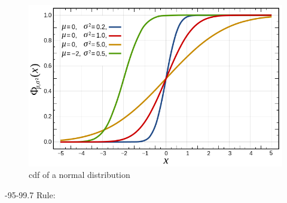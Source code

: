 \documentclass[	DIV=calc,%
paper=a4,%
fontsize=11pt,%
twocolumn]{scrartcl} %
\begin{document}
\begin{figure}[ht!]
	\centering
	\caption{cdf of a normal distribution}
	\label{fig:cdf-normal}
	\graphicspath{ {images/math/} }
	\includegraphics[width=\linewidth]{normal_distribution_cdf}
\end{figure}

-95-99.7 Rule:
\end{document}
